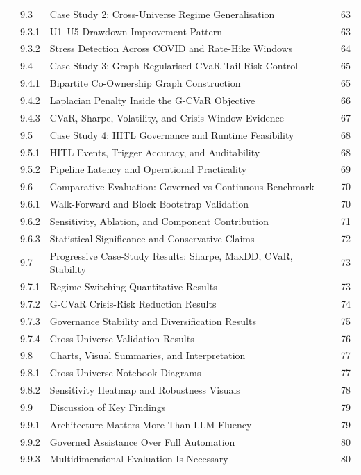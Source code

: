 \documentclass[11pt]{article}
\begin{document}
\begin{longtable}{C{0.8cm}C{1.2cm}L{9.7cm}C{1.2cm}}
 & 9.3 & Case Study 2: Cross-Universe Regime Generalisation & 63 \\
 & 9.3.1 & U1--U5 Drawdown Improvement Pattern & 63 \\
 & 9.3.2 & Stress Detection Across COVID and Rate-Hike Windows & 64 \\
 & 9.4 & Case Study 3: Graph-Regularised CVaR Tail-Risk Control & 65 \\
 & 9.4.1 & Bipartite Co-Ownership Graph Construction & 65 \\
 & 9.4.2 & Laplacian Penalty Inside the G-CVaR Objective & 66 \\
 & 9.4.3 & CVaR, Sharpe, Volatility, and Crisis-Window Evidence & 67 \\
 & 9.5 & Case Study 4: HITL Governance and Runtime Feasibility & 68 \\
 & 9.5.1 & HITL Events, Trigger Accuracy, and Auditability & 68 \\
 & 9.5.2 & Pipeline Latency and Operational Practicality & 69 \\
 & 9.6 & Comparative Evaluation: Governed vs Continuous Benchmark & 70 \\
 & 9.6.1 & Walk-Forward and Block Bootstrap Validation & 70 \\
 & 9.6.2 & Sensitivity, Ablation, and Component Contribution & 71 \\
 & 9.6.3 & Statistical Significance and Conservative Claims & 72 \\
 & 9.7 & Progressive Case-Study Results: Sharpe, MaxDD, CVaR, Stability & 73 \\
 & 9.7.1 & Regime-Switching Quantitative Results & 73 \\
 & 9.7.2 & G-CVaR Crisis-Risk Reduction Results & 74 \\
 & 9.7.3 & Governance Stability and Diversification Results & 75 \\
 & 9.7.4 & Cross-Universe Validation Results & 76 \\
 & 9.8 & Charts, Visual Summaries, and Interpretation & 77 \\
 & 9.8.1 & Cross-Universe Notebook Diagrams & 77 \\
 & 9.8.2 & Sensitivity Heatmap and Robustness Visuals & 78 \\
 & 9.9 & Discussion of Key Findings & 79 \\
 & 9.9.1 & Architecture Matters More Than LLM Fluency & 79 \\
 & 9.9.2 & Governed Assistance Over Full Automation & 80 \\
 & 9.9.3 & Multidimensional Evaluation Is Necessary & 80 \\

\end{longtable}
\end{document}
